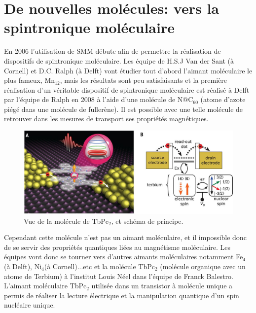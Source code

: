 \section{De nouvelles molécules: vers la spintronique moléculaire}
En 2006 l'utilisation de SMM débute afin de permettre la réalisation de dispositifs de spintronique moléculaire. Les équipe de H.S.J Van der Sant (à Cornell) et D.C. Ralph (à Delft) vont étudier tout d'abord l'aimant moléculaire le plus fameux, Mn$_{12}$, mais les résultats sont peu satisfaisants et la première réalisation d'un véritable dispositif de spintronique moléculaire est réalisé à Delft par l'équipe de Ralph en 2008 à l'aide d'une molécule de N@C$_{60}$ (atome d'azote piégé dans une molécule de fullerène). Il est possible avec une telle molécule de retrouver dans les mesures de transport ses propriétés magnétiques.\\

\begin{figure}[h]
    \begin{center}
        \includegraphics{Images/TbPc2.jpg}
        \caption{Vue de la molécule de TbPc$_2$, et schéma de principe.}
        \label{fig:}
    \end{center}
\end{figure}

Cependant cette molécule n'est pas un aimant moléculaire, et il impossible donc de se servir des propriétés quantiques liées au magnétisme moléculaire. Les équipes vont donc se tourner vers d'autres aimants moléculaires notamment Fe$_{4}$ (à Delft), Ni$_{4}$(à Cornell)...etc et la molécule TbPc$_{2}$ (molécule organique avec un atome de Terbium) à l'institut Louis Néel dans l'équipe de Franck Balestro. L'aimant moléculaire TbPc$_{2}$ utilisée dans un transistor à molécule unique a permis de réaliser la lecture électrique et la manipulation quantique d'un spin nucléaire unique.
